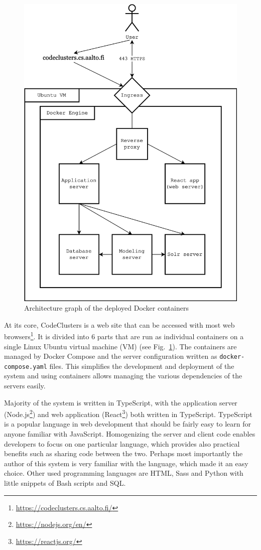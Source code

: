 \begin{figure}
\centering 
\includegraphics{images/architecture.png}
\caption{Architecture graph of the deployed Docker containers\label{fig:architecture}}
\end{figure}

At its core, CodeClusters is a web site that can be accessed with most web browsers\footnote{\url{https://codeclusters.cs.aalto.fi/}}. It is divided into 6 parts that are run as individual containers on a single Linux Ubuntu virtual machine (VM) (see Fig.~\ref{fig:architecture}). The containers are managed by Docker Compose and the server configuration written as \texttt{docker-compose.yaml} files. This simplifies the development and deployment of the system and using containers allows managing the various dependencies of the servers easily.

Majority of the system is written in TypeScript, with the application server (Node.js\footnote{\url{https://nodejs.org/en/}}) and web application (React\footnote{\url{https://reactjs.org/}}) both written in TypeScript. TypeScript is a popular language in web development that should be fairly easy to learn for anyone familiar with JavaScript. Homogenizing the server and client code enables developers to focus on one particular language, which provides also practical benefits such as sharing code between the two. Perhaps most importantly the author of this system is very familiar with the language, which made it an easy choice. Other used programming languages are HTML, Sass and Python with little snippets of Bash scripts and SQL.

